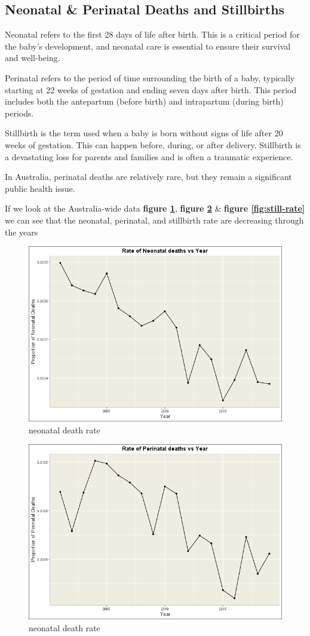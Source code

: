 \subsection{Neonatal \& Perinatal Deaths and Stillbirths}
Neonatal refers to the first 28 days of life after birth. This is a critical period for the baby's development, and neonatal care is essential to ensure their survival and well-being.

Perinatal refers to the period of time surrounding the birth of a baby, typically starting at 22 weeks of gestation and ending seven days after birth. This period includes both the antepartum (before birth) and intrapartum (during birth) periods.

Stillbirth is the term used when a baby is born without signs of life after 20 weeks of gestation. This can happen before, during, or after delivery. Stillbirth is a devastating loss for parents and families and is often a traumatic experience.

In Australia, perinatal deaths are relatively rare, but they remain a significant public health issue.

If we look at the Australia-wide data \textbf{figure \ref{fig:neo-rate}}, \textbf{figure \ref{fig:peri-rate}} \& \textbf{figure \ref{fig:still-rate}} we can see that the neonatal, perinatal, and stillbirth rate are decreasing through the years

\begin{figure}
  \centering
  \includegraphics[width=.5\textwidth]{img/aus/kanishka/neonatal_deaths.png}
  \caption{neonatal death rate}
  \label{fig:neo-rate}
\end{figure}

\begin{figure}
  \centering
  \includegraphics[width=.5\textwidth]{img/aus/kanishka/perinatal_deaths.png}
  \caption{neonatal death rate}
  \label{fig:peri-rate}
\end{figure}

